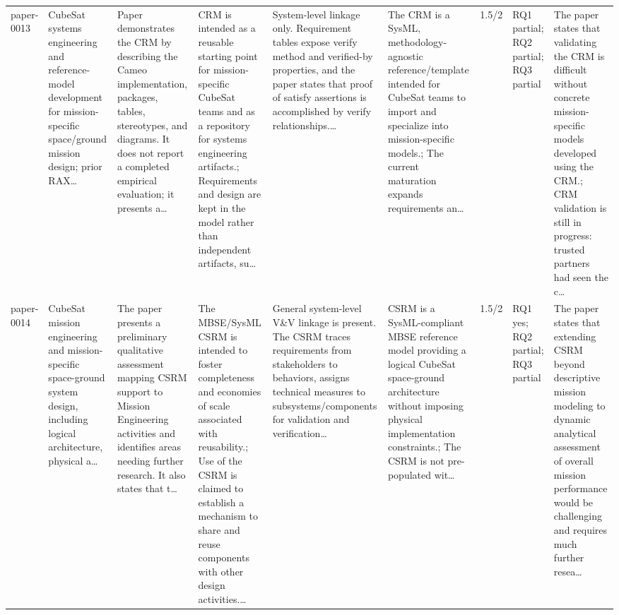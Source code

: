 \documentclass[10pt]{article}
\begin{document}
\begin{landscape}
\begin{longtable}{p{1.0cm}p{2.4cm}p{3.1cm}p{3.7cm}p{3.4cm}p{3.1cm}p{1.0cm}p{1.8cm}p{3.4cm}}
paper-0013 & CubeSat systems engineering and reference-model development for mission-specific space/ground mission design; prior RAX… & Paper demonstrates the CRM by describing the Cameo implementation, packages, tables, stereotypes, and diagrams. It does not report a completed empirical evaluation; it presents a… & CRM is intended as a reusable starting point for mission-specific CubeSat teams and as a repository for systems engineering artifacts.; Requirements and design are kept in the model rather than independent artifacts, su… & System-level linkage only. Requirement tables expose verify method and verified-by properties, and the paper states that proof of satisfy assertions is accomplished by verify relationships.… & The CRM is a SysML, methodology-agnostic reference/template intended for CubeSat teams to import and specialize into mission-specific models.; The current maturation expands requirements an… & 1.5/2 & RQ1 partial; RQ2 partial; RQ3 partial & The paper states that validating the CRM is difficult without concrete mission-specific models developed using the CRM.; CRM validation is still in progress: trusted partners had seen the c… \\
paper-0014 & CubeSat mission engineering and mission-specific space-ground system design, including logical architecture, physical a… & The paper presents a preliminary qualitative assessment mapping CSRM support to Mission Engineering activities and identifies areas needing further research. It also states that t… & The MBSE/SysML CSRM is intended to foster completeness and economies of scale associated with reusability.; Use of the CSRM is claimed to establish a mechanism to share and reuse components with other design activities.… & General system-level V\&V linkage is present. The CSRM traces requirements from stakeholders to behaviors, assigns technical measures to subsystems/components for validation and verification… & CSRM is a SysML-compliant MBSE reference model providing a logical CubeSat space-ground architecture without imposing physical implementation constraints.; The CSRM is not pre-populated wit… & 1.5/2 & RQ1 yes; RQ2 partial; RQ3 partial & The paper states that extending CSRM beyond descriptive mission modeling to dynamic analytical assessment of overall mission performance would be challenging and requires much further resea… \\

\end{longtable}
\end{landscape}
\end{document}
